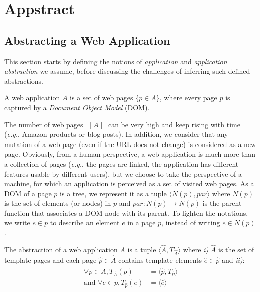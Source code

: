 \section{Appstract}\label{sec:appstract}
\subsection{Abstracting a Web Application}
This section starts by defining the notions of \emph{application} and \emph{application abstraction} we assume, before discussing the challenges of inferring such defined abstractions.

\begin{defn}[\em Application]
A web application $A$ is a set of web pages $\{p \in A\}$, where every page $p$ is captured by a \emph{Document Object Model} (DOM).
\end{defn}

The number of web pages $\|A\|$ can be very high and keep rising with time (\emph{e.g.}, Amazon products or blog posts).
In addition, we consider that any mutation of a web page (even if the URL does not change) is considered as a new page.
Obviously, from a human perspective, a web application is much more than a collection of pages (\emph{e.g.}, the pages are linked, the application has different features usable by different users), but we choose to take the perspective of a machine, for which an application is perceived as a set of visited web pages.
% 
As a DOM of a page $p$ is a tree, we represent it as a tuple $\langle N(p), par \rangle$ where $N(p)$ is the set of elements (or nodes) in $p$ and $par: N(p) \to N(p)$ is the parent function that associates a DOM node with its parent.
To lighten the notations, we write $e \in p$ to describe an element $e$ in a page $p$, instead of writing $e \in N(p)$.

\begin{defn}
The abstraction of a web application $A$ is a tuple $\langle\hat{A}, T_{\hat{A}}\rangle$ where \emph{i)} $\hat{A}$ is the set of template pages and each page $\hat{p} \in \hat{A}$ contains template elements $\hat{e} \in \hat{p}$ and \emph{ii)}:
\begin{align}
  \label{eq:1}
  \begin{split}
    \forall p \in A, T_{\hat{A}}(p) & = \langle\hat{p}, T_{\hat{p}}\rangle \\
    \text{and } \forall e \in p, T_{\hat{p}}(e) & = \langle\hat{e}\rangle
  \end{split}
\end{align}\end{defn}

